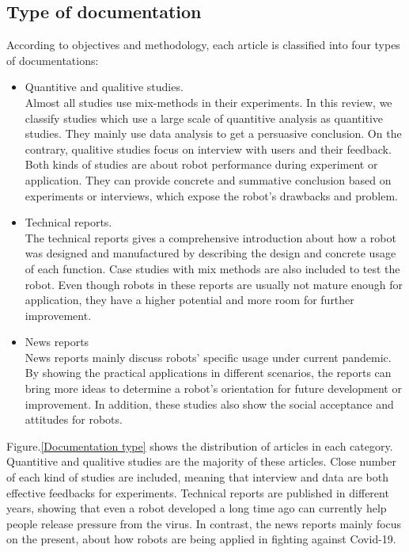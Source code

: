 \documentclass[a4paper]{article}
\begin{document}
\subsection{Type of documentation}
    According to objectives and methodology, each article is classified into four types of documentations:
\begin{itemize}
    \item Quantitive and qualitive studies.
    \\Almost all studies use mix-methods in their experiments. In this review, we classify studies which use a large scale of quantitive analysis as quantitive studies. They mainly use data analysis to get a persuasive conclusion. On the contrary, qualitive studies focus on interview with users and their feedback. Both kinds of studies are about robot performance during experiment or application. They can provide concrete and summative conclusion based on experiments or interviews, which expose the robot's drawbacks and problem.   
    \item Technical reports.
    \\The technical reports gives a comprehensive introduction about how a robot was designed and manufactured by describing the design and concrete usage of each function. Case studies with mix methods are also included to test the robot. Even though robots in these reports are usually not mature enough for application, they have a higher potential and more room for further improvement.
    \item News reports  
    \\News reports mainly discuss robots' specific usage under current pandemic. By showing the practical applications in different scenarios, the reports can bring more ideas to determine a robot's orientation for future development or improvement. In addition, these studies also show the social acceptance and attitudes for robots. 
\end{itemize}
    Figure.\ref{Documentation type} shows the distribution of articles in each category. Quantitive and qualitive studies are the majority of these articles. Close number of each kind of studies are included, meaning that interview and data are both effective feedbacks for experiments. Technical reports are published in different years, showing that even a robot developed a long time ago can currently help people release pressure from the virus. In contrast, the news reports mainly focus on the present, about how robots are being applied in fighting against Covid-19. 
\end{document}
